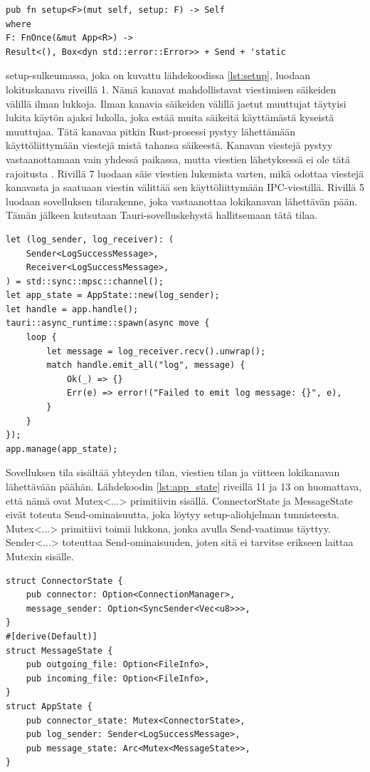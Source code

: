 \documentclass[a4paper,12pt]{article}
\begin{document}
    \begin{lstlisting}[caption={Setup-aliohjelman tunniste.}, label={lst:setup_signature}]
pub fn setup<F>(mut self, setup: F) -> Self
where
F: FnOnce(&mut App<R>) ->
Result<(), Box<dyn std::error::Error>> + Send + 'static
    \end{lstlisting}


    setup-sulkeumassa, joka on kuvattu lähdekoodissa \ref{lst:setup}, luodaan lokituskanava riveillä 1. Nämä kanavat mahdollistavat viestimisen säikeiden välillä ilman lukkoja. Ilman kanavia säikeiden välillä jaetut muuttujat täytyisi lukita käytön ajaksi lukolla, joka estää muita säikeitä käyttämästä kyseistä muuttujaa. Tätä kanavaa pitkin Rust-prosessi pystyy lähettämään käyttöliittymään viestejä mistä tahansa säikeestä. Kanavan viestejä pystyy vastaanottamaan vain yhdessä paikassa, mutta viestien lähetyksessä ei ole tätä rajoitusta \cite[luku 16.2]{rust-book}. Rivillä 7 luodaan säie viestien lukemista varten, mikä odottaa viestejä kanavasta ja saatuaan viestin välittää sen käyttöliittymään IPC-viestillä. Rivillä 5 luodaan sovelluksen tilarakenne, joka vastaanottaa lokikanavan lähettävän pään. Tämän jälkeen kutsutaan Tauri-sovelluskehystä hallitsemaan tätä tilaa.
    
    \begin{lstlisting}[caption={setup-sulkeuma.}, label={lst:setup}]
let (log_sender, log_receiver): (
    Sender<LogSuccessMessage>,
    Receiver<LogSuccessMessage>,
) = std::sync::mpsc::channel();
let app_state = AppState::new(log_sender);
let handle = app.handle();
tauri::async_runtime::spawn(async move {
    loop {
        let message = log_receiver.recv().unwrap();
        match handle.emit_all("log", message) {
            Ok(_) => {}
            Err(e) => error!("Failed to emit log message: {}", e),
        }
    }
});
app.manage(app_state);\end{lstlisting}

    Sovelluksen tila sisältää yhteyden tilan, viestien tilan ja viitteen lokikanavan lähettävään päähän. Lähdekoodin \ref{lst:app_state} riveillä 11 ja 13 on huomattava, että nämä ovat Mutex<...> primitiivin sisällä. ConnectorState ja MessageState eivät toteuta Send-ominaisuutta, joka löytyy setup-aliohjelman tunnisteesta. Mutex<...> primitiivi toimii lukkona, jonka avulla Send-vaatimus täyttyy. Sender<...> toteuttaa Send-ominaisuuden, joten sitä ei tarvitse erikseen laittaa Mutexin sisälle.

    
    \begin{lstlisting}[caption={Sovellustilan rakenne.}, label={lst:app_state}]
struct ConnectorState {
    pub connector: Option<ConnectionManager>,
    message_sender: Option<SyncSender<Vec<u8>>>,
}
#[derive(Default)]
struct MessageState {
    pub outgoing_file: Option<FileInfo>,
    pub incoming_file: Option<FileInfo>,
}
struct AppState {
    pub connector_state: Mutex<ConnectorState>,
    pub log_sender: Sender<LogSuccessMessage>,
    pub message_state: Arc<Mutex<MessageState>>,
}\end{lstlisting}
\end{document}
